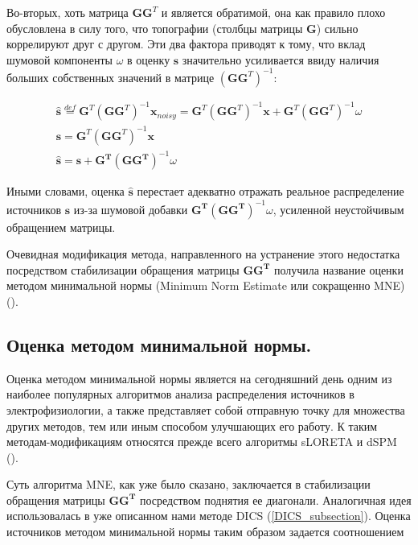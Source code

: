 Во-вторых, хоть матрица $\mathbf{G}\mathbf{G}^T$ и является обратимой, она как
правило плохо обусловлена в силу того, что топографии (столбцы матрицы
$\mathbf{G}$) сильно коррелируют друг с другом.  Эти два фактора
приводят к тому, что вклад шумовой компоненты $\omega$ в оценку $\mathbf{s}$
значительно усиливается ввиду наличия больших собственных значений в матрице
${(\mathbf{G}\mathbf{G}^T)}^{-1}$:

\begin{gather*}
    \mathbf{\hat{s}} \stackrel{def}{=} \mathbf{G}^T{(\mathbf{G}\mathbf{G}^T)}^{-1}\mathbf{x}_{noisy} = 
    \mathbf{G}^T{(\mathbf{G}\mathbf{G}^T)}^{-1}\mathbf{x} +
    \mathbf{G}^T{(\mathbf{G}\mathbf{G}^T)}^{-1}\omega\\
    \mathbf{s} = \mathbf{G}^T{(\mathbf{G}\mathbf{G}^T)}^{-1}\mathbf{x}
    \\
    \mathbf{\hat{s}} =  \mathbf{s + G^T{(GG^T)}}^{-1}\omega
\end{gather*}

Иными словами, оценка $\mathbf{\hat{s}}$ перестает адекватно отражать реальное распределение
источников $\mathbf{s}$ из-за шумовой добавки $\mathbf{G^T{(GG^T)}}^{-1}\omega$, усиленной
неустойчивым обращением матрицы.

Очевидная модификация метода, направленного на устранение этого недостатка
посредством стабилизации обращения матрицы $\mathbf{GG^T}$ получила название
оценки методом минимальной нормы (Minimum Norm Estimate или сокращенно MNE)
(\cite{MNE_paper}).

\subsection{Оценка методом минимальной нормы.}

Оценка методом минимальной нормы является на сегодняшний день одним из наиболее
популярных алгоритмов анализа распределения источников в электрофизиологии, а
также представляет собой отправную точку для множества других методов, тем или
иным способом улучшающих его работу. К таким методам-модификациям относятся
прежде всего алгоритмы sLORETA и dSPM (\cite{sLORETA_paper, dSPM_paper}).

Суть алгоритма MNE, как уже было сказано, заключается в стабилизации обращения
матрицы $\mathbf{GG^T}$ посредством поднятия ее диагонали. Аналогичная идея
использовалась в уже описанном нами методе DICS (\ref{DICS_subsection}).
Оценка источников методом минимальной нормы таким образом задается соотношением

